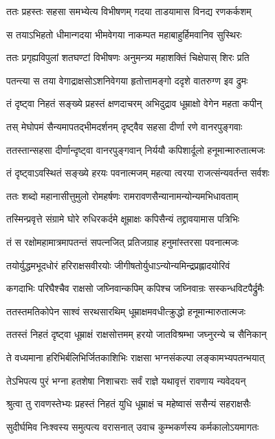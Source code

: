 \twolineshloka
{ततः प्रहस्तः सहसा समभ्येत्य विभीषणम्}
{गदया ताडयामास विनद्य रणकर्कशम्}


\twolineshloka
{स तयाऽभिहतो धीमान्गदया भीमवेगया}
{नाकम्पत महाबाहुर्हिमवानिव सुस्थिरः}


\twolineshloka
{ततः प्रगृह्यविपुलां शतघण्टां विभीषणः}
{अनुमन्त्र्य महाशक्तिं चिक्षेपास् शिरः प्रति}


\twolineshloka
{पतन्त्या स तया वेगाद्राक्षसोऽशनिवेगया}
{हृतोत्तामङ्गो ददृशे वातरुग्ण इव द्रुमः}


\twolineshloka
{तं दृष्ट्वा निहतं सङ्ख्ये प्रहस्तं क्षणदाचरम्}
{अभिदुद्राव धूम्राक्षो वेगेन महता कपीन्}


\twolineshloka
{तस् मेघोपमं सैन्यमापतद्भीमदर्शनम्}
{दृष्ट्वैव सहसा दीर्णा रणे वानरपुङ्गवाः}


\twolineshloka
{ततस्तान्सहसा दीर्णान्दृष्ट्वा वानरपुङ्गवान्}
{निर्ययौ कपिशार्दूलो हनूमान्मारुतात्मजः}


\twolineshloka
{तं दृष्ट्वाऽवस्थितं सङ्ख्ये हरयः पवनात्मजम्}
{महत्या त्वरया राजत्संन्यवर्तन्त सर्वशः}


\twolineshloka
{ततः शब्दो महानासीत्तुमुलो रोमहर्षणः}
{रामरावणसैन्यानामन्योन्यमभिधावताम्}


\twolineshloka
{तस्मिन्प्रवृत्ते संग्रामे घोरे रुधिरकर्दमे}
{क्षूम्राक्षः कपिसैन्यं तद्द्रावयामास पत्रिभिः}


\twolineshloka
{तं स रक्षोमहामात्रमापतन्तं सपत्नजित्}
{प्रतिजग्राह हनुमांस्तरसा पवनात्मजः}


\twolineshloka
{तयोर्युद्धमभूदधोरं हरिराक्षसवीरयोः}
{जीगीषतोर्युधाऽन्योन्यमिन्द्रप्रह्लादयोरिवं}


\twolineshloka
{कगदाभिः परिघैश्चैव राक्षसो जघ्निवान्कपिम्}
{कपिश्च जघ्निवान्रः सस्कन्धविटपैर्द्रुमैः}


\twolineshloka
{ततस्तमतिकोपेन साश्वं सरथसारथिम्}
{धूम्राक्षमवधीत्क्रुद्धो हनूमान्मारुतात्मजः}


\twolineshloka
{ततस्तं निहतं दृष्ट्वा धूम्राक्षं राक्षसोत्तमम्}
{हरयो जातविश्रम्भा जघ्नुरन्ये च सैनिकान्}


\twolineshloka
{ते वध्यमाना हरिभिर्बलिभिर्जितकाशिभिः}
{राक्षसा भग्नसंकल्पा लङ्कामभ्यपतन्भयात्}


\twolineshloka
{तेऽभिपत्य पुरं भग्ना हतशेषा निशाचराः}
{सर्वं राज्ञे यथावृत्तं रावणाय न्यवेदयन्}


\twolineshloka
{श्रुत्वा तु रावणस्तेभ्यः प्रहस्तं निहतं युधि}
{धूम्राक्षं च महेष्वासं ससैन्यं सहराक्षसैः}


\twolineshloka
{सुदीर्घमिव निःश्वस्य समुत्पत्य वरासनात्}
{उवाच कुम्भकर्णस्य कर्मकालोऽयमागतः}


